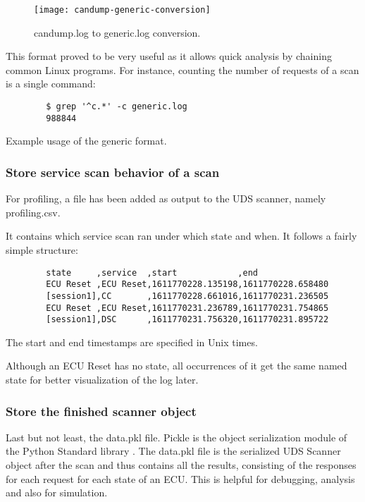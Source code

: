 \begin{figure}[h]
    \centering
    \texttt{[image: candump-generic-conversion]}
    \caption{candump.log to generic.log conversion.}
    \label{fig:candump-generic-conversion}
\end{figure}

This format proved to be very useful as it allows quick analysis by chaining common Linux programs.
For instance, counting the number of requests of a scan is a single command:
\begin{listing}[H]
\begin{verbatim}
        $ grep '^c.*' -c generic.log
        988844
\end{verbatim}
\caption{Example usage of the generic format.}
\label{lst:usage-generic}
\end{listing}

\subsubsection{Store service scan behavior of a scan}

For profiling, a file has been added as output to the UDS scanner, namely profiling.csv.

It contains which service scan ran under which state and when. It follows a fairly simple structure:

\begin{samepage}
    \begin{verbatim}
        state     ,service  ,start            ,end
        ECU Reset ,ECU Reset,1611770228.135198,1611770228.658480
        [session1],CC       ,1611770228.661016,1611770231.236505
        ECU Reset ,ECU Reset,1611770231.236789,1611770231.754865
        [session1],DSC      ,1611770231.756320,1611770231.895722
    \end{verbatim}
\end{samepage}

The start and end timestamps are specified in Unix times.

Although an ECU Reset has no state, all occurrences of it get the same named state for better visualization of the log later.

\subsubsection{Store the finished scanner object}

Last but not least, the data.pkl file. Pickle is the object serialization module of the Python Standard library \cite{pickle}. The data.pkl file is the serialized UDS Scanner object after the scan and thus contains all the results, consisting of the responses for each request for each state of an ECU. This is helpful for debugging, analysis and also for simulation.


